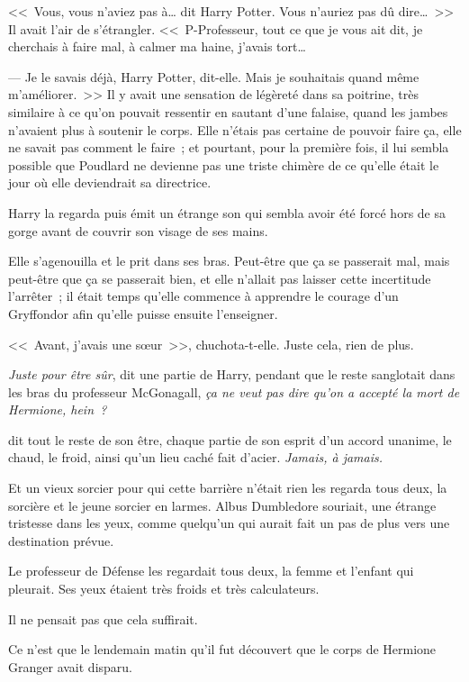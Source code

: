 <<~Vous, vous n'aviez pas à… dit Harry Potter. Vous n'auriez pas dû dire…~>> Il avait l'air de s'étrangler. <<~P-Professeur, tout ce que je vous ait dit, je cherchais à faire mal, à calmer ma haine, j'avais tort…

--- Je le savais déjà, Harry Potter, dit-elle. Mais je souhaitais quand même m'améliorer.~>> Il y avait une sensation de légèreté dans sa poitrine, très similaire à ce qu'on pouvait ressentir en sautant d'une falaise, quand les jambes n'avaient plus à soutenir le corps. Elle n'étais pas certaine de pouvoir faire ça, elle ne savait pas comment le faire~; et pourtant, pour la première fois, il lui sembla possible que Poudlard ne devienne pas une triste chimère de ce qu'elle était le jour où elle deviendrait sa directrice.

Harry la regarda puis émit un étrange son qui sembla avoir été forcé hors de sa gorge avant de couvrir son visage de ses mains.

Elle s'agenouilla et le prit dans ses bras. Peut-être que ça se passerait mal, mais peut-être que ça se passerait bien, et elle n'allait pas laisser cette incertitude l'arrêter~; il était temps qu'elle commence à apprendre le courage d'un Gryffondor afin qu'elle puisse ensuite l'enseigner.

<<~Avant, j'avais une sœur~>>, chuchota-t-elle. Juste cela, rien de plus.

\later

\emph{Juste pour être sûr}, dit une partie de Harry, pendant que le reste sanglotait dans les bras du professeur McGonagall, \emph{ça ne veut pas dire qu'on a accepté la mort de Hermione, hein~?}

\emph{} dit tout le reste de son être, chaque partie de son esprit d'un accord unanime, le chaud, le froid, ainsi qu'un lieu caché fait d'acier. \emph{Jamais, à jamais.}

\later

Et un vieux sorcier pour qui cette barrière n'était rien les regarda tous deux, la sorcière et le jeune sorcier en larmes. Albus Dumbledore souriait, une étrange tristesse dans les yeux, comme quelqu'un qui aurait fait un pas de plus vers une destination prévue.

\later

Le professeur de Défense les regardait tous deux, la femme et l'enfant qui pleurait. Ses yeux étaient très froids et très calculateurs.

Il ne pensait pas que cela suffirait.

\later

Ce n'est que le lendemain matin qu'il fut découvert que le corps de Hermione Granger avait disparu. 


